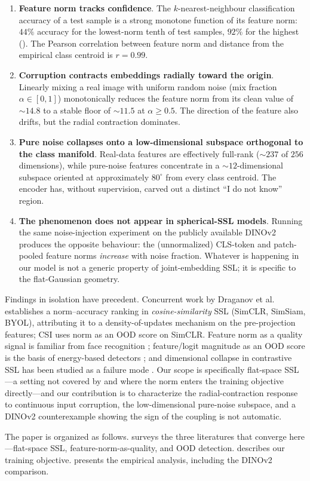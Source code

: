 \begin{enumerate}
    \item \textbf{Feature norm tracks confidence}. The $k$-nearest-neighbour classification accuracy of a test sample is a strong monotone function of its feature norm: $44\%$ accuracy for the lowest-norm tenth of test samples, $92\%$ for the highest (). The Pearson correlation between feature norm and distance from the empirical class centroid is $r = 0.99$.
    \item \textbf{Corruption contracts embeddings radially toward the origin}. Linearly mixing a real image with uniform random noise (mix fraction $\alpha \in [0, 1]$) monotonically reduces the feature norm from its clean value of $\sim 14.8$ to a stable floor of $\sim 11.5$ at $\alpha \ge 0.5$. The direction of the feature also drifts, but the radial contraction dominates.
    \item \textbf{Pure noise collapses onto a low-dimensional subspace orthogonal to the class manifold}. Real-data features are effectively full-rank ($\sim 237$ of $256$ dimensions), while pure-noise features concentrate in a $\sim 12$-dimensional subspace oriented at approximately $80^\circ$ from every class centroid. The encoder has, without supervision, carved out a distinct ``I do not know'' region.
    \item \textbf{The phenomenon does not appear in spherical-SSL models}. Running the same noise-injection experiment on the publicly available DINOv2 \citep{oquab2023dinov2} produces the opposite behaviour: the (unnormalized) CLS-token and patch-pooled feature norms \emph{increase} with noise fraction. Whatever is happening in our model is not a generic property of joint-embedding SSL; it is specific to the flat-Gaussian geometry.
\end{enumerate}

Findings in isolation have precedent. Concurrent work by Draganov et al.~\citep{draganov2025embedding_norms} establishes a norm--accuracy ranking in \emph{cosine-similarity} SSL (SimCLR, SimSiam, BYOL), attributing it to a density-of-updates mechanism on the pre-projection features; CSI \citep{tack2020csi} uses norm as an OOD score on SimCLR. Feature norm as a quality signal is familiar from face recognition \citep{meng2021magface, kim2022adaface}; feature/logit magnitude as an OOD score is the basis of energy-based detectors \citep{liu2020energy}; and dimensional collapse in contrastive SSL has been studied as a failure mode \citep{jing2022dimensional}. Our scope is specifically flat-space SSL---a setting not covered by \citep{draganov2025embedding_norms} and where the norm enters the training objective directly---and our contribution is to characterize the radial-contraction response to continuous input corruption, the low-dimensional pure-noise subspace, and a DINOv2 counterexample showing the sign of the coupling is not automatic.

The paper is organized as follows.  surveys the three literatures that converge here---flat-space SSL, feature-norm-as-quality, and OOD detection.  describes our training objective.  presents the empirical analysis, including the DINOv2 comparison.
